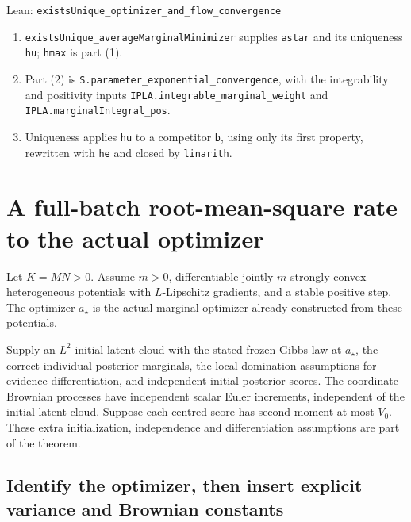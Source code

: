 \documentclass[11pt,a4paper]{report}
\begin{document}
\begin{leanbox}{Lean: \texttt{existsUnique\_\allowbreak{}optimizer\_\allowbreak{}and\_\allowbreak{}flow\_\allowbreak{}convergence}}
\begin{enumerate}
\item \texttt{exists\allowbreak{}Unique\_\allowbreak{}average\allowbreak{}Marginal\allowbreak{}Minimizer} supplies \texttt{astar} and its uniqueness \texttt{hu}; \texttt{hmax} is part (1).

\item Part (2) is \texttt{S.\allowbreak{}parameter\_\allowbreak{}exponential\_\allowbreak{}convergence}, with the integrability and positivity inputs \texttt{IPLA.\allowbreak{}integrable\_\allowbreak{}marginal\_\allowbreak{}weight} and \texttt{IPLA.\allowbreak{}marginal\allowbreak{}Integral\_\allowbreak{}pos}.

\item Uniqueness applies \texttt{hu} to a competitor \texttt{b}, using only its first property, rewritten with \texttt{he} and closed by \texttt{linarith}.

\end{enumerate}
\end{leanbox}
\section{\texorpdfstring{A full-batch root-mean-square rate to the actual optimizer}{A full-batch root-mean-square rate to the actual optimizer}}


Let \(K=MN>0\). Assume \(m>0\), differentiable jointly \(m\)-strongly convex heterogeneous potentials with \(L\)-Lipschitz gradients, and a stable positive step. The optimizer \(a_\star\) is the actual marginal optimizer already constructed from these potentials.




Supply an \(L^2\) initial latent cloud with the stated frozen Gibbs law at \(a_\star\), the correct individual posterior marginals, the local domination assumptions for evidence differentiation, and independent initial posterior scores. The coordinate Brownian processes have independent scalar Euler increments, independent of the initial latent cloud. Suppose each centred score has second moment at most \(V_0\). These extra initialization, independence and differentiation assumptions are part of the theorem.

\subsection{\texorpdfstring{Identify the optimizer, then insert explicit variance and Brownian constants}{Identify the optimizer, then insert explicit variance and Brownian constants}}
\end{document}
